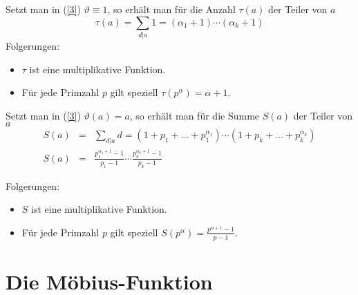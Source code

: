 \documentclass[11pt]{article}
\begin{document}
Setzt man in (\ref{3}) $\vartheta\equiv 1$, so erh\"{a}lt man f\"{u}r die
Anzahl $\tau(a)$ der Teiler von $a$
\[\tau(a)=\sum_{d|a}1=(\alpha_1+1)\cdots(\alpha_k+1)\]
Folgerungen:
\begin{itemize}
\item $\tau$ ist eine multiplikative Funktion.
\item F\"{u}r jede Primzahl $p$ gilt speziell $\tau(p^\alpha)=\alpha+1$.
\end{itemize}

\noindent Setzt man in (\ref{3}) $\vartheta(a)=a$, so erh\"{a}lt man f\"{u}r
die Summe $S(a)$ der Teiler von $a$
\begin{eqnarray*}S(a)&=&\sum_{d|a}d=(1+p_1+\ldots+p_1^{\alpha_1})\cdots(1+p_k+\ldots+p_k^{\alpha_k})\\
S(a)&=&\frac{p_1^{\alpha_1+1}-1}{p_1-1}\cdots\frac{p_k^{\alpha_k+1}-1}{p_k-1}
\end{eqnarray*}

\noindent Folgerungen:
\begin{itemize}
\item $S$ ist eine multiplikative Funktion.
\item F\"{u}r jede Primzahl $p$ gilt speziell
$S(p^\alpha)=\frac{p^{\alpha+1}-1}{p-1}$.
\end{itemize}

\section{Die M\"{o}bius-Funktion}
\end{document}
